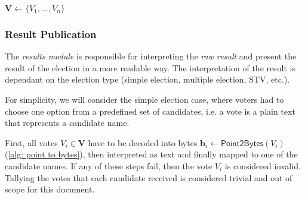 \begin{algorithm}[ht]
    \DontPrintSemicolon
    \caption{$\mathsf{FinalizeDecryption} (\boldsymbol{e}, \boldsymbol{S}_1, ..., \boldsymbol{S}_{n_\mathrm{d}})$}
    \label{alg: finalize decryption}
    
    $\boldsymbol{V} \gets \{ V_1, ..., V_n \}$ \;
     
\end{algorithm}


\subsubsection{Result Publication} \label{sec: result publication}
The \textit{results module} is responsible for interpreting the \textit{raw result} and present the result of the election in a more readable way. The interpretation of the result is dependant on the election type (simple election, multiple election, STV, etc.).

For simplicity, we will consider the simple election case, where voters had to choose one option from a predefined set of candidates, i.e. a vote is a plain text that represents a candidate name.

First, all votes $V_i \in \boldsymbol{V}$ have to be decoded into bytes $\boldsymbol{b}_i \gets \mathsf{Point2Bytes}(V_i)$ (\cref{alg: point to bytes}), then interpreted as text and finally mapped to one of the candidate names. If any of these steps fail, then the vote $V_i$ is considered invalid. Tallying the votes that each candidate received is considered trivial and out of scope for this document.

